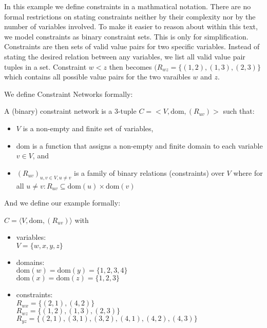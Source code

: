 In this example we define constraints in a mathmatical notation. There are no formal restrictions on stating constraints neither by their complexity nor by the number of variables involved. To make it easier to reason about within this text, we model constraints as binary constraint sets. This is only for simplification. Constraints are then sets of valid value pairs for two specific variables. Instead of stating the desired relation between any variables, we list all valid value pair tuples in a set. Constraint $w < z$ then becomes $(R_{wz} = \{(1, 2), (1, 3), (2, 3)\}$ which contains all possible value pairs for the two varaibles $w$ and $z$.

We define Constraint Networks formally:

\begin{tcolorbox}
	A (binary) constraint network is a 3-tuple $C = <V, \text{dom}, (R_{uv})>$ such that:
	\begin{itemize}
		\item $V$ is a non-empty and finite set of variables,
		\item dom is a function that assigns a non-empty and finite domain to each variable $v \in V$, and
		\item $(R_{uv})_{u,v \in V, u \neq v}$ is a family of binary relations (constraints) over $V$ where for all $u \neq v: R_{uv} \subseteq \text{dom}(u) \times \text{dom}(v)$
	\end{itemize}
\end{tcolorbox}

And we define our example formally:

\begin{tcolorbox}
	$C = \langle V, \text{dom}, (R_{uv})\rangle$ with
	\begin{itemize}
		\item variables: \\
		      $V = \{w, x, y, z\}$
		\item domains: \\
		      $\text{dom}(w) = \text{dom}(y) = \{1, 2, 3, 4\}$ \\
		      $\text{dom}(x) = \text{dom}(z) = \{1, 2, 3\}$
		\item constraints: \\
		      $R_{wx} = \{(2, 1), (4, 2)\}$ \\
		      $R_{wz} = \{(1, 2), (1, 3), (2, 3)\}$ \\
		      $R_{yz} = \{(2, 1), (3, 1), (3, 2), (4, 1), (4, 2), (4, 3)\}$ \\
	\end{itemize}
\end{tcolorbox}

